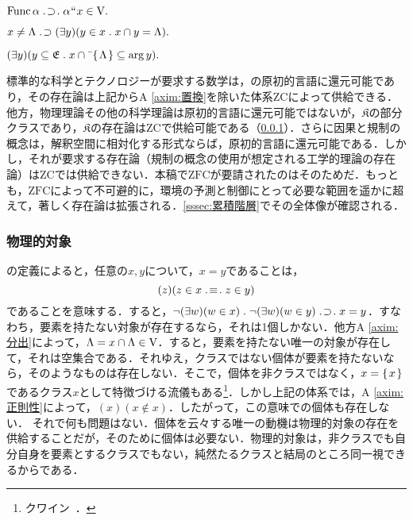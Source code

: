 \begin{axim}[置換]
\label{axim:置換}
$
    \func\alpha\case{1}{1}{1}\alpha\img x\in\univ.
$
\end{axim}

\begin{axim}[正則性]
\label{axim:正則性}
$
    x\neq \Lambda {\;.\!}\supset (\exists y)(y\in x{\;.\;}x\cap y=\Lambda).
$
\end{axim}

\begin{axim}[選択]
\label{axim:選択}
$
    (\exists y)(
        y\subseteq\mathfrak{E}\con{1}x\cap\barl{\classab{\Lambda}}\subseteq\arg y
    ).
$
\end{axim}

\noindent 標準的な科学とテクノロジーが要求する数学は，の原初的言語に還元可能であり，その存在論は上記からA \ref{axim:置換}を除いた体系ZCによって供給できる．他方，物理理論その他の科学理論は原初的言語に還元可能ではないが，$\mathfrak{K}$の部分クラスであり，$\mathfrak{K}$の存在論はZCで供給可能である（\ref{sssec:物理的対象}）．さらに因果と規制の概念は，解釈空間に相対化する形式ならば，原初的言語に還元可能である．しかし，それが要求する存在論（規制の概念の使用が想定される工学的理論の存在論）はZCでは供給できない．本稿で$\mathrm{ZFC}$が要請されたのはそのためだ．もっとも，$\mathrm{ZFC}$によって不可避的に，環境の予測と制御にとって必要な範囲を遥かに超えて，著しく存在論は拡張される．\ref{sssec:累積階層}でその全体像が確認される．

\subsubsection{物理的対象}
\label{sssec:物理的対象}

の定義によると，任意の$ x,y $について，$ x = y $であることは，
\[
    (z)(z\in x\case{3}{1}{1}z\in y)
\]
であることを意味する．すると，$ \neg(\exists w)(w\in x)\con{1}\neg(\exists w)(w\in y)\case{1}{1}{1}x = y $．すなわち，要素を持たない対象が存在するなら，それは1個しかない．他方A \ref{axim:分出}によって，$ \Lambda = x\cap\Lambda\in\mathrm{V} $．すると，要素を持たない唯一の対象が存在して，それは空集合である．それゆえ，クラスではない個体が要素を持たないなら，そのようなものは存在しない．そこで，個体を非クラスではなく，$ x = \{\mspace{2mu}x\mspace{2mu}\} $であるクラス$ x $として特徴づける流儀もある\footnote{
    クワイン~\cite[p.\,29]{クワインa}．
}．しかし上記の体系では，A \ref{axim:正則性}によって，$ (x)(x\notin x) $．したがって，この意味での個体も存在しない．
それで何も問題はない．個体を云々する唯一の動機は物理的対象の存在を供給することだが，そのために個体は必要ない．物理的対象は，非クラスでも自分自身を要素とするクラスでもない，純然たるクラスと結局のところ同一視できるからである．

